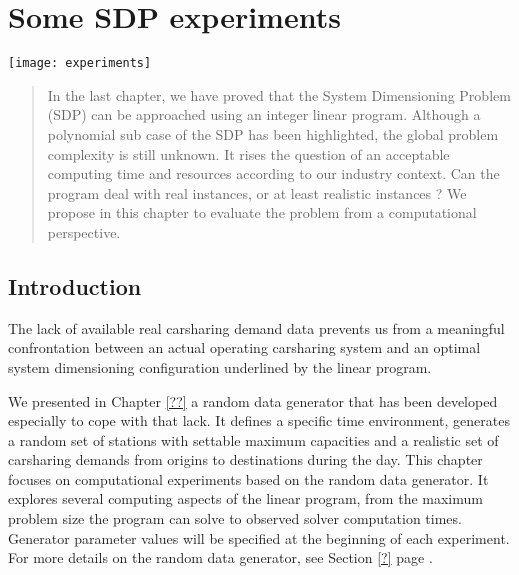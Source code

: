 \chapter{Some SDP experiments} \label{chap:sdpExp}
\begin{bibunit}[ieeetr]
\minitoc
\vspace{2cm}

\begin{minipage}[c]{0.3\linewidth}
\texttt{[image: experiments]}
\end{minipage}
\hfill
\begin{minipage}[c]{0.7\linewidth}
\begin{abstract}
In the last chapter, we have proved that the System Dimensioning Problem (SDP) can be approached using an integer linear program.
Although a polynomial sub case of the SDP has been highlighted, the global problem complexity is still unknown.
It rises the question of an acceptable computing time and resources according to our industry context.
Can the program deal with real instances, or at least realistic instances ?
We propose in this chapter to evaluate the problem from a computational perspective.
\end{abstract}
\end{minipage}

\newpage
\section{Introduction}

The lack of available real carsharing demand data prevents us from a meaningful confrontation between an actual operating carsharing system and an optimal system dimensioning configuration underlined by the linear program.

We presented in Chapter \ref{??} a random data generator that has been developed especially to cope with that lack.
It defines a specific time environment, generates a random set of stations with settable maximum capacities and a realistic set of carsharing demands from origins to destinations during the day.
This chapter focuses on computational experiments based on the random data generator.
It explores several computing aspects of the linear program, from the maximum problem size the program can solve to observed solver computation times.
Generator parameter values will be specified at the beginning of each experiment.
For more details on the random data generator, see Section \ref{?} page \pageref{?}.



\end{bibunit}
